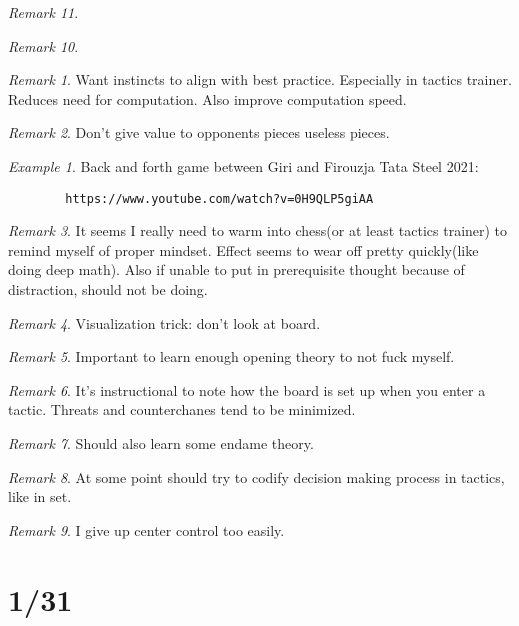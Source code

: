 \documentclass[11pt]{article}
\theoremstyle{remark}
\newtheorem{remark}{Remark}
\newtheorem{example}{Example}
\begin{document}
\begin{remark}
\begin{remark}
\begin{remark}
	Want instincts to align with best practice. Especially in tactics trainer. Reduces need for computation. Also improve computation speed.
\end{remark}

\begin{remark}
	Don't give value to opponents pieces useless pieces.
\end{remark}

\begin{example}
	Back and forth game between Giri and Firouzja Tata Steel 2021: 
	\begin{verbatim}
		https://www.youtube.com/watch?v=0H9QLP5giAA
	\end{verbatim}
\end{example}

\begin{remark}
	It seems I really need to warm into chess(or at least tactics trainer) to remind myself of proper mindset. Effect seems to wear off pretty quickly(like doing deep math). Also if unable to put in prerequisite thought because of distraction, should not be doing.
\end{remark}

\begin{remark}
	Visualization trick: don't look at board.
\end{remark}

\begin{remark}
	Important to learn enough opening theory to not fuck myself.
\end{remark}

\begin{remark}
	It's instructional to note how the board is set up when you enter a tactic. Threats and counterchanes tend to be minimized. 
\end{remark}

\begin{remark}
	Should also learn some endame theory.
\end{remark}

\begin{remark}
	At some point should try to codify decision making process in tactics, like in set.
\end{remark}

\begin{remark}
	I give up center control too easily.
\end{remark}

\section{1/31}


\end{remark}
\end{remark}
\end{document}
